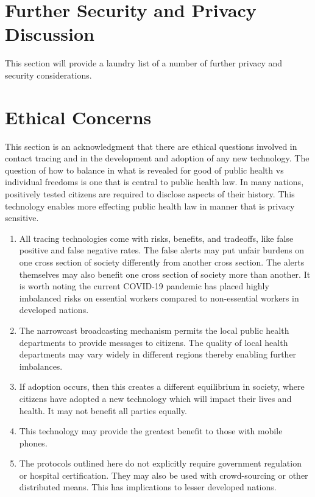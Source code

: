 \documentclass{article}
\begin{document}
\section{Further Security and Privacy Discussion}
This section will provide a laundry list of a number of further privacy and security considerations.

\section{Ethical Concerns}
This section is an acknowledgment that there are ethical questions involved in contact tracing and in the development and adoption of any new technology. The question of how to balance in what is revealed for good of public health vs individual freedoms is one that is central to public health law. In many nations, positively tested citizens are required to disclose aspects of their history.  This technology enables more effecting public health law in manner that is privacy sensitive.

\begin{enumerate}
\item All tracing technologies come with risks, benefits, and tradeoffs, like false positive and false negative rates.  The false alerts may put unfair burdens on one cross section of society differently from another cross section.  The alerts themselves may also benefit one cross section of society more than another. It is worth noting the current COVID-19 pandemic has placed highly imbalanced risks on essential workers compared to non-essential workers in developed nations.
\item The narrowcast broadcasting mechanism permits the local public health departments to provide messages to citizens. The quality of local health departments may vary widely in different regions thereby enabling further imbalances.
\item If adoption occurs, then this creates a different equilibrium in society, where citizens have adopted a new technology which will impact their lives and health. It may not benefit all parties equally.
\item This technology may provide the greatest benefit to those with mobile phones.
\item The protocols outlined here do not explicitly require government regulation or hospital certification. They may also be used with crowd-sourcing or other distributed means. This has implications to lesser developed nations.
\end{enumerate}
\end{document}
